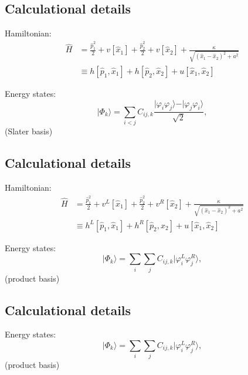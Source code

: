 \documentclass[%
oneside,                 %
final,                   %
10pt]{article}
\begin{document}
\vspace{6mm}

\subsection{Calculational details}

Hamiltonian:
\begin{align}
\hat{H} &= \frac{\hat{p}_1^2}{2} + v[\hat{x}_1] + \frac{\hat{p}_2^2}{2} + v[\hat{x}_2] + \frac{\kappa}{\sqrt{(\hat{x}_1-\hat{x}_2)^2 + a^2}} \\
&\equiv h[\hat{p}_1,\hat{x}_1] + h[\hat{p}_2,\hat{x}_2] + u[\hat{x}_1,\hat{x}_2]
\end{align}

Energy states:
\begin{equation}
\vert\Phi_k\rangle = \sum_{i < j} C_{ij, k}\frac{\vert \varphi_i \varphi_j\rangle - \vert \varphi_j \varphi_i\rangle}{\sqrt{2}},
\end{equation}
(Slater basis)

\subsection{Calculational details}

Hamiltonian:
\begin{align}
\hat{H} &= \frac{\hat{p}_1^2}{2} + v^L[\hat{x}_1] + \frac{\hat{p}_2^2}{2} + v^R[\hat{x}_2] + \frac{\kappa}{\sqrt{(\hat{x}_1-\hat{x}_2)^2 + a^2}} \\
&\equiv h^L[\hat{p}_1,\hat{x}_1] + h^R[\hat{p}_2,\hat{x}_2] + u[\hat{x}_1,\hat{x}_2]
\end{align}

Energy states:
\begin{equation}
\vert\Phi_k\rangle = \sum_{i} \sum_{j} C_{ij, k}\vert \varphi^L_i \varphi^R_j\rangle,
\end{equation}
(product basis)

\subsection{Calculational details}

Energy states:
\begin{equation}
\vert\Phi_k\rangle = \sum_{i} \sum_{j} C_{ij, k}\vert \varphi^L_i \varphi^R_j\rangle,
\end{equation}
(product basis)

\vspace{6mm}
\end{document}
